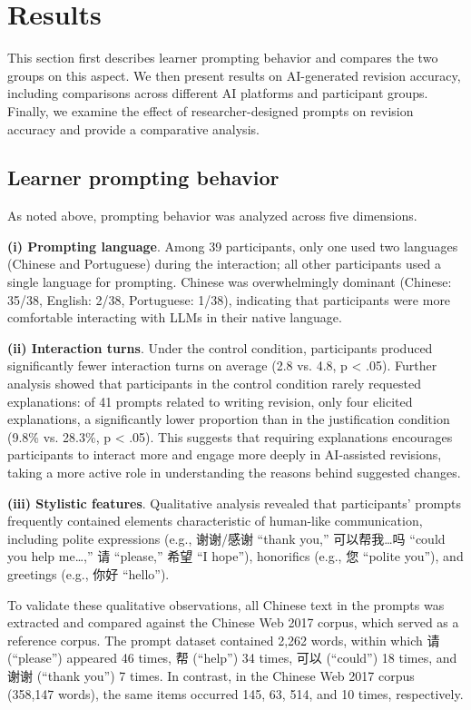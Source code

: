 \documentclass[english]{textolivre}
\begin{document}
\section{Results}\label{sec4}
This section first describes learner prompting behavior and compares the two groups on this aspect. We then present results on AI-generated revision accuracy, including comparisons across different AI platforms and participant groups. Finally, we examine the effect of researcher-designed prompts on revision accuracy and provide a comparative analysis.

\subsection{Learner prompting behavior}

As noted above, prompting behavior was analyzed across five dimensions.

\textbf{(i) Prompting language}. Among 39 participants, only one used two languages (Chinese and Portuguese) during the interaction; all other participants used a single language for prompting. Chinese was overwhelmingly dominant (Chinese: 35/38, English: 2/38, Portuguese: 1/38), indicating that participants were more comfortable interacting with LLMs in their native language.

\textbf{(ii) Interaction turns}. Under the control condition, participants produced significantly fewer interaction turns on average (2.8 vs. 4.8, p < .05). Further analysis showed that participants in the control condition rarely requested explanations: of 41 prompts related to writing revision, only four elicited explanations, a significantly lower proportion than in the justification condition (9.8\% vs. 28.3\%, p < .05). This suggests that requiring explanations encourages participants to interact more and engage more deeply in AI-assisted revisions, taking a more active role in understanding the reasons behind suggested changes.

\textbf{(iii) Stylistic features}. Qualitative analysis revealed that participants’ prompts frequently contained elements characteristic of human-like communication, including polite expressions (e.g., 谢谢/感谢 ``thank you,'' 可以帮我…吗 ``could you help me…,'' 请 ``please,'' 希望 ``I hope''), honorifics (e.g., 您 ``polite you''), and greetings (e.g., 你好 ``hello'').

To validate these qualitative observations, all Chinese text in the prompts was extracted and compared against the Chinese Web 2017 corpus, which served as a reference corpus. The prompt dataset contained 2,262 words, within which 请 (``please'') appeared 46 times, 帮 (``help'') 34 times, 可以 (``could'') 18 times, and 谢谢 (``thank you'') 7 times. In contrast, in the Chinese Web 2017 corpus (358,147 words), the same items occurred 145, 63, 514, and 10 times, respectively.
\end{document}
